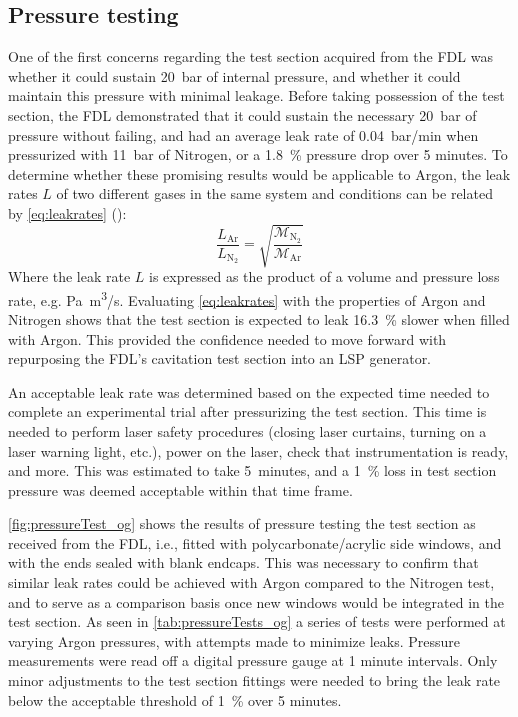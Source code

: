         \subsection{Pressure testing}
            One of the first concerns regarding the test section acquired from the FDL was whether it could sustain 20~bar of internal pressure, and whether it could maintain this pressure with minimal leakage. Before taking possession of the test section, the FDL demonstrated that it could sustain the necessary \qty{20}{bar} of pressure without failing, and had an average leak rate of \qty{0.04}{bar/min} when pressurized with \qty{11}{bar} of Nitrogen, or a 1.8~\% pressure drop over 5 minutes. To determine whether these promising results would be applicable to Argon, the leak rates $L$ of two different gases in the same system and conditions can be related by \autoref{eq:leakrates} (\textcite{greenhouseHermeticityElectronicPackages2012}):
            \begin{equation}
                \frac{L_\mathrm{Ar}}{L_{\mathrm{N}_2}} = \sqrt{\frac{\mathcal{M}_{\mathrm{N}_2}}{\mathcal{M}_\mathrm{Ar}}}
                \label{eq:leakrates}
            \end{equation}
            Where the leak rate $L$ is expressed as the product of a volume and pressure loss rate, e.g. \unit{Pa.m^3/s}. Evaluating \autoref{eq:leakrates} with the properties of Argon and Nitrogen shows that the test section is expected to leak 16.3~\% slower when filled with Argon. This provided the confidence needed to move forward with repurposing the FDL's cavitation test section into an LSP generator.
            
            An acceptable leak rate was determined based on the expected time needed to complete an experimental trial after pressurizing the test section. This time is needed to perform laser safety procedures (closing laser curtains, turning on a laser warning light, etc.), power on the laser, check that instrumentation is ready, and more. This was estimated to take 5~minutes, and a 1~\% loss in test section pressure was deemed acceptable within that time frame.

            \autoref{fig:pressureTest_og} shows the results of pressure testing the test section as received from the FDL, i.e., fitted with polycarbonate/acrylic side windows, and with the ends sealed with blank endcaps. This was necessary to confirm that similar leak rates could be achieved with Argon compared to the Nitrogen test, and to serve as a comparison basis once new windows would be integrated in the test section. As seen in \autoref{tab:pressureTests_og} a series of tests were performed at varying Argon pressures, with attempts made to minimize leaks. Pressure measurements were read off a digital pressure gauge at 1 minute intervals. Only minor adjustments to the test section fittings were needed to bring the leak rate below the acceptable threshold of 1~\% over 5 minutes. 

